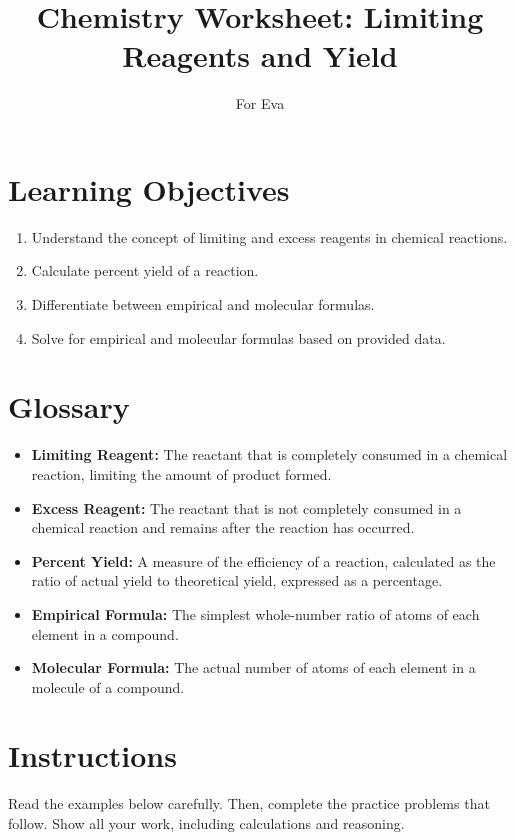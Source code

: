 \documentclass[12pt]{article}
\begin{document}
\title{Chemistry Worksheet: Limiting Reagents and Yield}
\author{For Eva}
\date{}
\maketitle

\section*{Learning Objectives}
\begin{enumerate}
    \item Understand the concept of limiting and excess reagents in chemical reactions.
    \item Calculate percent yield of a reaction.
    \item Differentiate between empirical and molecular formulas.
    \item Solve for empirical and molecular formulas based on provided data.
\end{enumerate}

\section*{Glossary}
\begin{itemize}
    \item \textbf{Limiting Reagent:} The reactant that is completely consumed in a chemical reaction, limiting the amount of product formed.
    \item \textbf{Excess Reagent:} The reactant that is not completely consumed in a chemical reaction and remains after the reaction has occurred.
    \item \textbf{Percent Yield:} A measure of the efficiency of a reaction, calculated as the ratio of actual yield to theoretical yield, expressed as a percentage.
    \item \textbf{Empirical Formula:} The simplest whole-number ratio of atoms of each element in a compound.
    \item \textbf{Molecular Formula:} The actual number of atoms of each element in a molecule of a compound.
\end{itemize}

\section*{Instructions}
Read the examples below carefully. Then, complete the practice problems that follow. Show all your work, including calculations and reasoning.
\end{document}
